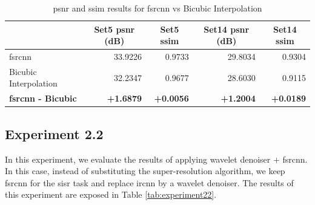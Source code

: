\begin{table}[]
	\centering
	\begin{tabular}{|l|r|r|r|r|}
		\hline
		\rowcolor[HTML]{EFEFEF}
		\multicolumn{1}{|c}{\cellcolor[HTML]{EFEFEF}\textbf{Method}} &
		\multicolumn{1}{c|}{\cellcolor[HTML]{EFEFEF}\textbf{Set5 \gls{psnr} (dB)}} & \multicolumn{1}{c|}{\cellcolor[HTML]{EFEFEF}\textbf{Set5 \gls{ssim}}} & \multicolumn{1}{c|}{\cellcolor[HTML]{EFEFEF}\textbf{Set14 \gls{psnr} (dB)}} & \multicolumn{1}{c|}{\cellcolor[HTML]{EFEFEF}\textbf{Set14 \gls{ssim}}} \\ \hline
		\rowcolor[HTML]{FFFFFF} 
		\gls{fsrcnn} & 33.9226 & 0.9733 & 29.8034 & 0.9304\\
		\rowcolor[HTML]{EFEFEF} 
		Bicubic Interpolation & 32.2347 & 0.9677 & 28.6030 & 0.9115\\\hline
		\textbf{\gls{fsrcnn} - Bicubic} & \textbf{+1.6879} & \textbf{+0.0056} & \textbf{+1.2004} & \textbf{+0.0189}\\\hline
	\end{tabular}
	\caption{\gls{psnr} and \gls{ssim} results for \gls{fsrcnn} vs Bicubic Interpolation}
	\label{tab:experiment}
\end{table}

\subsection{Experiment 2.2}
In this experiment, we evaluate the results of applying wavelet denoiser $+$ \gls{fsrcnn}. In this case, instead of substituting the super-resolution algorithm, we keep \gls{fsrcnn} for the \gls{sisr} task and replace \gls{ircnn} by a wavelet denoiser. The results of this experiment are exposed in Table \ref{tab:experiment22}.


